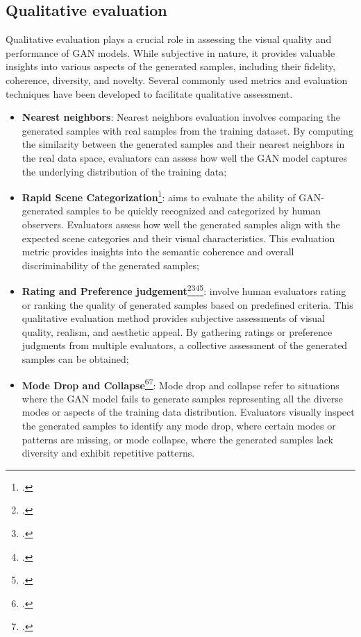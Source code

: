 \subsection{Qualitative evaluation}
\label{subsec:qualitative-evaluation}
Qualitative evaluation plays a crucial role in assessing the visual quality and performance of GAN models. 
While subjective in nature, it provides valuable insights into various aspects of the generated samples, including their fidelity, coherence, diversity, and novelty. 
Several commonly used metrics and evaluation techniques have been developed to facilitate qualitative assessment.
\begin{itemize}
    \item \textbf{Nearest neighbors}: Nearest neighbors evaluation involves comparing the generated samples with real samples from the training dataset. 
    By computing the similarity between the generated samples and their nearest neighbors in the real data space, evaluators can assess how well the GAN model captures the underlying distribution of the training data;
    \item \textbf{Rapid Scene Categorization}\footcite{paper:ganeval}: aims to evaluate the ability of GAN-generated samples to be quickly recognized and categorized by human observers. 
    Evaluators assess how well the generated samples align with the expected scene categories and their visual characteristics. This evaluation metric provides insights into the semantic coherence and overall discriminability of the generated samples;
    \item \textbf{Rating and Preference judgement}\footcite{paper:stackadvnet}\footcite{paper:stackadvnet1}\footcite{paper:stackadvnet2}\footcite{paper:stackadvnet3}:
    involve human evaluators rating or ranking the quality of generated samples based on predefined criteria. 
    This qualitative evaluation method provides subjective assessments of visual quality, realism, and aesthetic appeal. 
    By gathering ratings or preference judgments from multiple evaluators, a collective assessment of the generated samples can be obtained;
    \item \textbf{Mode Drop and Collapse}\footcite{paper:dropandcollapse}\footcite{paper:dropandcollapse2}: Mode drop and collapse refer to situations where the GAN model fails to generate samples representing all the diverse modes or aspects of the training data distribution. 
    Evaluators visually inspect the generated samples to identify any mode drop, where certain modes or patterns are missing, or mode collapse, where the generated samples lack diversity and exhibit repetitive patterns. 

\end{itemize}
